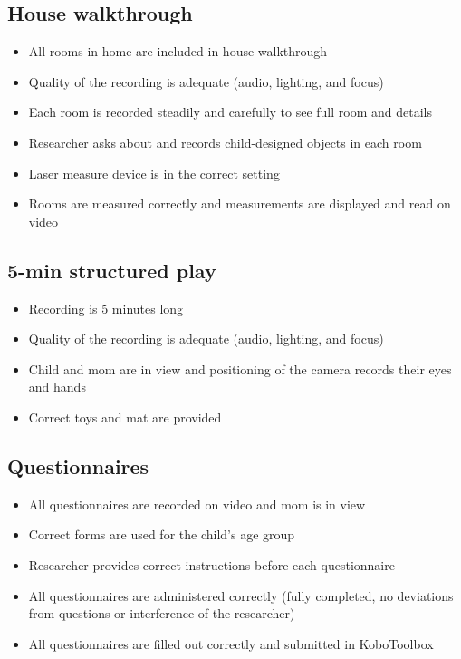 \documentclass[
]{book}
\providecommand{\tightlist}{%
  \setlength{\itemsep}{0pt}\setlength{\parskip}{0pt}}
\begin{document}
\hypertarget{house-walkthrough}{%
\subsection{House walkthrough}\label{house-walkthrough}}

\begin{itemize}
\tightlist
\item
  All rooms in home are included in house walkthrough
\item
  Quality of the recording is adequate (audio, lighting, and focus)
\item
  Each room is recorded steadily and carefully to see full room and details
\item
  Researcher asks about and records child-designed objects in each room
\item
  Laser measure device is in the correct setting
\item
  Rooms are measured correctly and measurements are displayed and read on video
\end{itemize}

\hypertarget{min-structured-play}{%
\subsection{5-min structured play}\label{min-structured-play}}

\begin{itemize}
\tightlist
\item
  Recording is 5 minutes long
\item
  Quality of the recording is adequate (audio, lighting, and focus)
\item
  Child and mom are in view and positioning of the camera records their eyes and hands
\item
  Correct toys and mat are provided
\end{itemize}

\hypertarget{questionnaires-1}{%
\subsection{Questionnaires}\label{questionnaires-1}}

\begin{itemize}
\tightlist
\item
  All questionnaires are recorded on video and mom is in view
\item
  Correct forms are used for the child's age group
\item
  Researcher provides correct instructions before each questionnaire
\item
  All questionnaires are administered correctly (fully completed, no deviations from questions or interference of the researcher)
\item
  All questionnaires are filled out correctly and submitted in KoboToolbox
\end{itemize}
\end{document}
